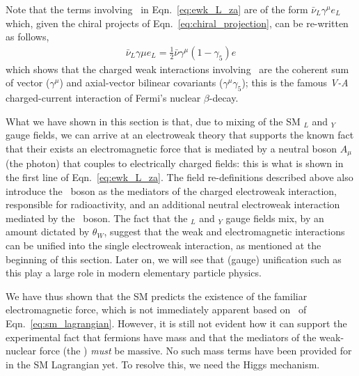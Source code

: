 Note that the terms involving \fieldWpm~in Eqn.~\ref{eq:ewk_L_za} are of the form $\bar{\nu}_L \gamma^{\mu} e_L$ which, given the chiral projects of Eqn.~\ref{eq:chiral_projection}, can be
re-written as follows,
\begin{align}
	\bar{\nu}_L \gamma{\mu} e_L = \frac{1}{2} \bar{\nu} \gamma^{\mu}(1-\gamma_5) e
	\label{eq:v_minus_a}
\end{align}
which shows that the charged weak interactions involving \fieldWpm~are the coherent
sum of vector ($\gamma^{\mu}$) and axial-vector bilinear covariants ($\gamma^{\mu}\gamma_5$); this is the famous \textit{V-A} charged-current interaction of Fermi's nuclear $\beta$-decay.

What we have shown in this section is that, due to mixing of the SM \SUtwo$_L$
and \Uone$_Y$ gauge fields, we can arrive at an electroweak theory that supports
the known fact that their exists an electromagnetic force that is mediated
by a neutral boson $A_{\mu}$ (the photon) that couples to electrically charged fields: this is what
is shown in the first line of Eqn.~\ref{eq:ewk_L_za}. The field re-definitions described above
also introduce the \fieldWpm~boson as the mediators of the charged electroweak interaction,
responsible for radioactivity, and an additional neutral electroweak interaction mediated
by the \fieldZ~boson.
The fact that the \SUtwo$_L$ and \Uone$_Y$ gauge fields mix, by an amount dictated by $\theta_W$,
suggest that the weak and electromagnetic interactions can be unified into the single
electroweak interaction, as mentioned at the beginning of this section. Later on, we will see
that (gauge) unification such as this play a large role in modern elementary particle physics.

We have thus shown that the SM predicts the existence of the familiar electromagnetic force,
which is not immediately apparent based on \SML~of Eqn.~\ref{eq:sm_lagrangian}. 
However, it is still not evident how it can
support the experimental fact that fermions have mass and that the mediators of the
weak-nuclear force (the \fieldWpm) \textit{must} be massive. No such mass terms
have been provided for in the SM Lagrangian yet. To resolve this, we
need the Higgs mechanism.